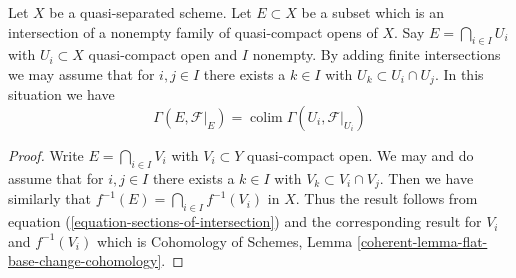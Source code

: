\documentclass{stacks-project}
\theoremstyle{plain}
\theoremstyle{definition}
\theoremstyle{remark}
\numberwithin{equation}{subsection}
\def\colim{\mathop{\mathrm{colim}}\nolimits}
\begin{document}
\medskip\noindent
Let $X$ be a quasi-separated scheme. Let $E \subset X$ be a subset
which is an intersection of a nonempty family of quasi-compact opens of $X$.
Say $E = \bigcap_{i \in I} U_i$ with $U_i \subset X$ quasi-compact open
and $I$ nonempty.
By adding finite intersections we may assume that for $i, j \in I$
there exists a $k \in I$ with $U_k \subset U_i \cap U_j$.
In this situation we have
\begin{equation}
\label{equation-sections-of-intersection}
\Gamma(E, \mathcal{F}|_E) = \colim \Gamma(U_i, \mathcal{F}|_{U_i})
\end{equation}

\begin{proof}
Write $E = \bigcap_{i \in I} V_i$ with $V_i \subset Y$ quasi-compact open.
We may and do assume that for $i, j \in I$ there exists a $k \in I$ with
$V_k \subset V_i \cap V_j$. Then we have similarly that
$f^{-1}(E) = \bigcap_{i \in I} f^{-1}(V_i)$ in $X$.
Thus the result follows from equation (\ref{equation-sections-of-intersection})
and the corresponding result for $V_i$ and $f^{-1}(V_i)$ which is
Cohomology of Schemes, Lemma \ref{coherent-lemma-flat-base-change-cohomology}.
\end{proof}
\end{document}

